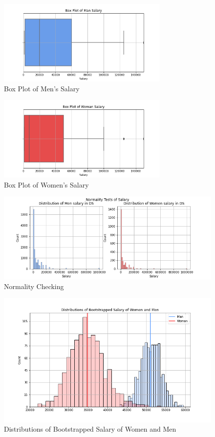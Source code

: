 \documentclass[10pt,onecolumn,letterpaper]{article}
\begin{document}
\begin{figure}[htbp]
  \centering
  \includegraphics[width=0.75\textwidth]{f12.png}
  \caption{Box Plot of Men's Salary}
\end{figure}

\begin{figure}[htbp]
  \centering
  \includegraphics[width=0.75\textwidth]{f13.png}
  \caption{Box Plot of Women's Salary}
\end{figure}

\begin{figure}[htbp]
  \centering
  \includegraphics[width=1\textwidth]{f14.png}
  \caption{Normality Checking}
\end{figure}

\begin{figure}[htbp]
  \centering
  \includegraphics[width=1\textwidth]{f15.png}
  \caption{Distributions of Bootstrapped Salary of Women and Men}
\end{figure}
\end{document}
